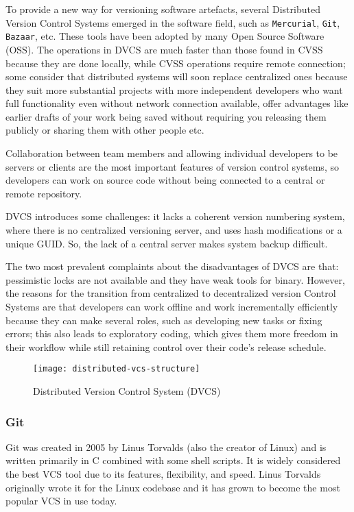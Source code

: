 To provide a new way for versioning software artefacts, several Distributed Version Control Systems emerged in the software field, such as \lstinline{Mercurial}, \lstinline{Git}, \lstinline{Bazaar}, etc. These tools have been adopted by many Open Source Software (OSS). The operations in DVCS are much faster than those found in CVSS because they are done locally, while CVSS operations require remote connection; some consider that distributed systems will soon replace centralized ones because they suit more substantial projects with more independent developers who want full functionality even without network connection available, offer advantages like earlier drafts of your work being saved without requiring you releasing them publicly or sharing them with other people etc.

Collaboration between team members and allowing individual developers to be servers or clients are the most important features of version control systems, so developers can work on source code without being connected to a central or remote repository.

DVCS introduces some challenges: it lacks a coherent version numbering system, where there is no centralized versioning server, and uses hash modifications or a unique GUID. So, the lack of a central server makes system backup difficult.

The two most prevalent complaints about the disadvantages of DVCS are that: pessimistic locks are not available and they have weak tools for binary. However, the reasons for the transition from centralized to decentralized version Control Systems are that developers can work offline and work incrementally efficiently because they can make several roles, such as developing new tasks or fixing errors; this also leads to exploratory coding, which gives them more freedom in their workflow while still retaining control over their code's release schedule.

\begin{figure}[htbp]
    \centering
    \texttt{[image: distributed-vcs-structure]}
    \caption{Distributed Version Control System (DVCS)}
    \label{fig:dvcs-structure}
\end{figure}

\subsubsection{Git}
\label{sec:git}
Git was created in 2005 by Linus Torvalds (also the creator of Linux) and is written primarily in C combined with some shell scripts. It is widely considered the best VCS tool due to its features, flexibility, and speed. Linus Torvalds originally wrote it for the Linux codebase and it has grown to become the most popular VCS in use today.


